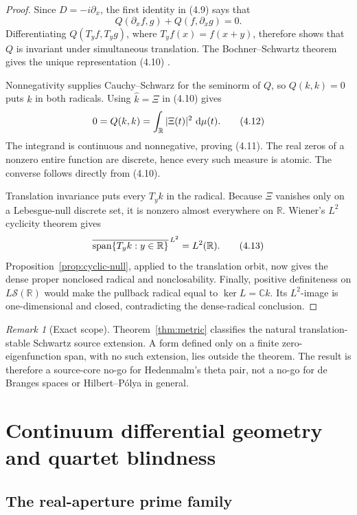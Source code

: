 \documentclass[11pt]{article}
\theoremstyle{definition}
\theoremstyle{remark}
\newtheorem{remark}[theorem]{Remark}
\newcommand{\C}{\mathbb C}
\newcommand{\R}{\mathbb R}
\newcommand{\cS}{\mathcal S}
\newcommand{\dd}{\,\mathrm d}
\newcommand{\eqtag}[1]{\qquad\text{\upshape(#1)}}
\begin{document}
\begin{proof}
Since \(D=-i\partial_x\), the first identity in (4.9) says that
\[
 Q(\partial_xf,g)+Q(f,\partial_xg)=0.
\]
Differentiating \(Q(T_yf,T_yg)\), where \(T_yf(x)=f(x+y)\), therefore
shows that \(Q\) is invariant under simultaneous translation.
The Bochner--Schwartz theorem gives the unique representation (4.10)
\cite{Schwartz1966}.

Nonnegativity supplies Cauchy--Schwarz for the seminorm of \(Q\), so
\(Q(k,k)=0\) puts \(k\) in both radicals.  Using
\(\widehat k=\Xi\) in (4.10) gives
\[
 0=Q(k,k)=\int_{\R}|\Xi(t)|^2\,\dd\mu(t).            \eqtag{4.12}
\]
The integrand is continuous and nonnegative, proving (4.11).
The real zeros of a nonzero entire function are discrete, hence every
such measure is atomic.  The converse follows directly from (4.10).

Translation invariance puts every \(T_yk\) in the radical.  Because
\(\Xi\) vanishes only on a Lebesgue-null discrete set, it is nonzero
almost everywhere on \(\R\).  Wiener's \(L^2\) cyclicity theorem
\cite{Wiener1932} gives
\[
 \overline{\operatorname{span}\{T_yk:y\in\R\}}^{\,L^2}
 =L^2(\R).                                          \eqtag{4.13}
\]
Proposition~\ref{prop:cyclic-null}, applied to the translation orbit,
now gives the dense proper nonclosed radical and nonclosability.
Finally,
positive definiteness on \(L\cS(\R)\) would make the pullback radical
equal to \(\ker L=\C k\).  Its \(L^2\)-image is one-dimensional and
closed, contradicting the dense-radical conclusion.
\end{proof}

\begin{remark}[Exact scope]
Theorem~\ref{thm:metric} classifies the natural translation-stable
Schwartz source extension.  A form defined only on a finite
zero-eigenfunction span, with no such extension, lies outside the
theorem.  The result is therefore a source-core no-go for Hedenmalm's
theta pair, not a no-go for de Branges spaces or Hilbert--P\'olya in
general.
\end{remark}

\section{Continuum differential geometry and quartet blindness}

\subsection{The real-aperture prime family}
\end{document}
